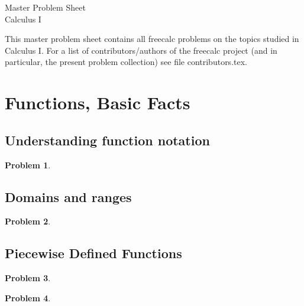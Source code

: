 \documentclass{article}
\newtheorem{problem}{Problem}
\begin{document}
\begin{center}
\Large
Master Problem Sheet \\ Calculus I \\ 
\end{center}





This master problem sheet contains all freecalc problems on the topics studied in Calculus I. For a list of contributors/authors of the freecalc project (and in particular, the present problem collection) see file contributors.tex.


\fcLicenseContent



\tableofcontents

\section{Functions, Basic Facts}\label{secMPSfunctionBasics}
\subsection{Understanding function notation}
\begin{problem}

\end{problem}
\subsection{Domains and ranges}
\begin{problem}

\end{problem}
\subsection{Piecewise Defined Functions}
\begin{problem}

\end{problem}

\begin{problem}

\end{problem}
\end{document}
